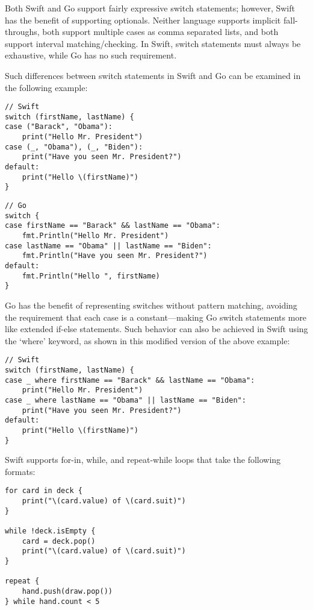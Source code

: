 \documentclass[letterpaper]{article}
\begin{document}
Both Swift and Go support fairly expressive switch statements; however, Swift has the benefit of supporting optionals. Neither language supports implicit fall-throughs, both support multiple cases as comma separated lists, and both support interval matching/checking. In Swift, switch statements must always be exhaustive, while Go has no such requirement.

Such differences between switch statements in Swift and Go can be examined in the following example:

\begin{verbatim}
// Swift
switch (firstName, lastName) {
case ("Barack", "Obama"):
    print("Hello Mr. President")
case (_, "Obama"), (_, "Biden"):
    print("Have you seen Mr. President?")
default:
    print("Hello \(firstName)")
}
\end{verbatim}

\begin{verbatim}
// Go
switch {
case firstName == "Barack" && lastName == "Obama":
    fmt.Println("Hello Mr. President")
case lastName == "Obama" || lastName == "Biden":
    fmt.Println("Have you seen Mr. President?")
default:
    fmt.Println("Hello ", firstName)
}
\end{verbatim}

 Go has the benefit of representing switches without pattern matching, avoiding the requirement that each case is a constant—making Go switch statements more like extended if-else statements. Such behavior can also be achieved in Swift using the `where' keyword, as shown in this modified version of the above example:

 \begin{verbatim}
// Swift
switch (firstName, lastName) {
case _ where firstName == "Barack" && lastName == "Obama":
    print("Hello Mr. President")
case _ where lastName == "Obama" || lastName == "Biden":
    print("Have you seen Mr. President?")
default:
    print("Hello \(firstName)")
}
\end{verbatim}

Swift supports for-in, while, and repeat-while loops that take the following formats:

\begin{verbatim}
for card in deck {
    print("\(card.value) of \(card.suit)")
}

while !deck.isEmpty {
    card = deck.pop()
    print("\(card.value) of \(card.suit)")
}

repeat {
    hand.push(draw.pop())
} while hand.count < 5
\end{verbatim}
\end{document}
